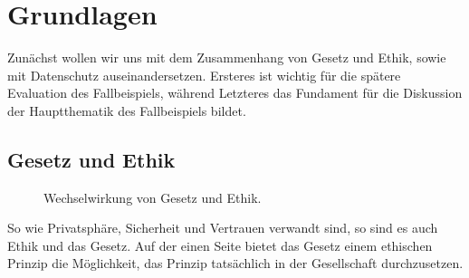 \section{Grundlagen}

Zunächst wollen wir uns mit dem Zusammenhang von Gesetz und Ethik, sowie mit Datenschutz auseinandersetzen.
Ersteres ist wichtig für die spätere Evaluation des Fallbeispiels,
während Letzteres das Fundament für die Diskussion der Hauptthematik des Fallbeispiels bildet.

\subsection{Gesetz und Ethik}
\label{sec:02:lawethics}

\begin{figure}
    \centering
    \caption{Wechselwirkung von Gesetz und Ethik.}
    \label{fig:02:lawethics}
\end{figure}

So wie Privatsphäre, Sicherheit und Vertrauen verwandt sind, so sind es auch Ethik und das Gesetz.
Auf der einen Seite bietet das Gesetz einem ethischen Prinzip die Möglichkeit, 
das Prinzip tatsächlich in der Gesellschaft durchzusetzen. \cite{lee_ethical_2016}

